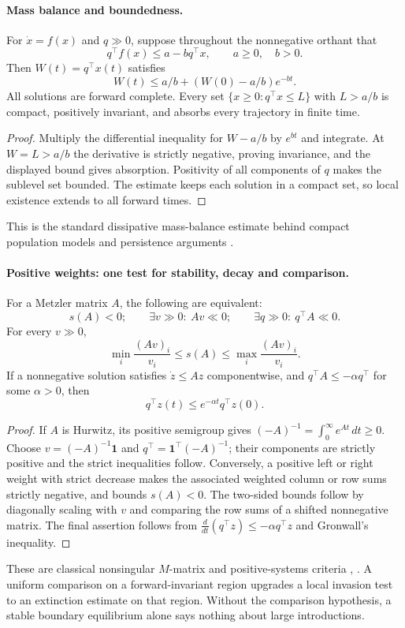 \paragraph{Mass balance and boundedness.}
For $\dot x=f(x)$ and $q\gg0$, suppose throughout the nonnegative orthant that
\[
 q^\top f(x)\leq a-bq^\top x,\qquad a\geq0,\quad b>0.
\]
Then $W(t)=q^\top x(t)$ satisfies
\[
 W(t)\leq a/b+(W(0)-a/b)e^{-bt}.
\]
All solutions are forward complete. Every set
$\{x\geq0:q^\top x\leq L\}$ with $L>a/b$ is compact,
positively invariant, and absorbs every trajectory in finite time.
\eeP
\begin{proof}
Multiply the differential inequality for $W-a/b$ by $e^{bt}$ and
integrate. At $W=L>a/b$ the derivative is strictly negative, proving
invariance, and the displayed bound gives absorption. Positivity of
all components of $q$ makes the sublevel set bounded. The estimate keeps
each solution in a compact set, so local existence extends to all forward times.
\end{proof}
This is the standard dissipative mass-balance estimate behind compact
population models and persistence arguments \cite{SmithThieme2011,HS10}.
\fi
\paragraph{Positive weights: one test for stability, decay and comparison.}

For a Metzler matrix $A$, the following are equivalent:
\[
 s(A)<0;\qquad \exists v\gg0:\ Av\ll0;
 \qquad \exists q\gg0:\ q^\top A\ll0.
\]
For every $v\gg0$,
\[
 \min_i\frac{(Av)_i}{v_i}\leq s(A)
 \leq\max_i\frac{(Av)_i}{v_i}.
\]
If a nonnegative solution satisfies
$\dot z\leq Az$ componentwise, and $q^\top A\leq-\alpha q^\top$
for some $\alpha>0$, then
\[
 q^\top z(t)\leq e^{-\alpha t}q^\top z(0).
\]
\eeP
\begin{proof}
If $A$ is Hurwitz, its positive semigroup gives
$(-A)^{-1}=\int_0^\infty e^{At}\,dt\geq0$.
Choose $v=(-A)^{-1}\mathbf1$ and
$q^\top=\mathbf1^\top(-A)^{-1}$; their components are strictly
positive and the strict inequalities follow. Conversely, a positive
left or right weight with strict decrease makes the associated
weighted column or row sums strictly negative, and bounds $s(A)<0$.
The two-sided bounds follow by diagonally scaling with $v$ and
comparing the row sums of a shifted nonnegative matrix.
The final assertion follows from
$\frac{d}{dt}(q^\top z)\leq-\alpha q^\top z$ and Gronwall's inequality.
\end{proof}
These are classical nonsingular $M$-matrix and positive-systems
criteria \cite{Berman}, \cite{rantzer2015scalable}. A uniform comparison on a forward-invariant
region upgrades a local invasion test to an extinction estimate on
that region. Without the comparison hypothesis, a stable boundary
equilibrium alone says nothing about large introductions.

